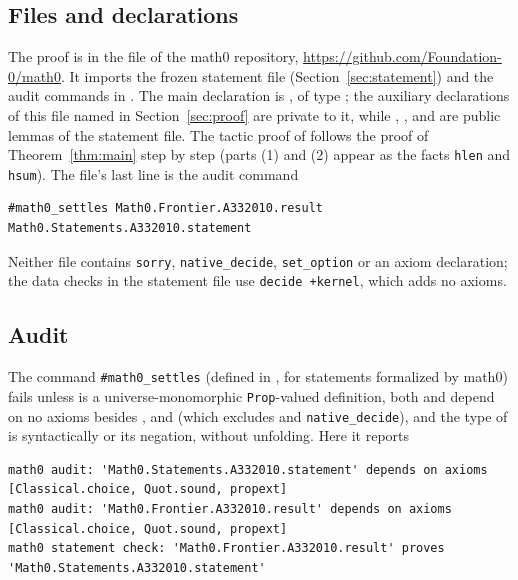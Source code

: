 \documentclass[11pt]{amsart}
\theoremstyle{plain}
\theoremstyle{definition}
\begin{document}
\subsection*{Files and declarations}
The proof is in the file  of the math0 repository, \url{https://github.com/Foundation-0/math0}. It imports the frozen statement file  (Section~\ref{sec:statement}) and the audit commands in . The main declaration is , of type ; the auxiliary declarations of this file named in Section~\ref{sec:proof} are private to it, while , ,  and  are public lemmas of the statement file. The tactic proof of  follows the proof of Theorem~\ref{thm:main} step by step (parts (1) and (2) appear as the facts \texttt{hlen} and \texttt{hsum}). The file's last line is the audit command
\begin{lstlisting}
#math0_settles Math0.Frontier.A332010.result Math0.Statements.A332010.statement
\end{lstlisting}
Neither file contains \texttt{sorry}, \texttt{native\_decide}, \texttt{set\_option} or an axiom declaration; the data checks in the statement file use \texttt{decide +kernel}, which adds no axioms.

\subsection*{Audit}
The command \texttt{\#math0\_settles} (defined in , for statements formalized by math0) fails unless  is a universe-monomorphic \texttt{Prop}-valued definition, both  and  depend on no axioms besides ,  and  (which excludes  and \texttt{native\_decide}), and the type of  is syntactically  or its negation, without unfolding. Here it reports
\begin{lstlisting}[basicstyle=\ttfamily\tiny]
math0 audit: 'Math0.Statements.A332010.statement' depends on axioms [Classical.choice, Quot.sound, propext]
math0 audit: 'Math0.Frontier.A332010.result' depends on axioms [Classical.choice, Quot.sound, propext]
math0 statement check: 'Math0.Frontier.A332010.result' proves 'Math0.Statements.A332010.statement'
\end{lstlisting}
\end{document}
